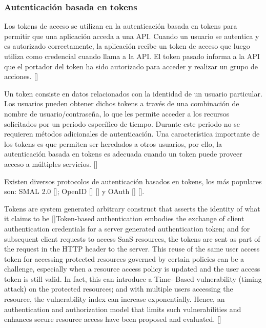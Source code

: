 
\subsubsection{Autenticación basada en tokens}

Los tokens de acceso se utilizan en la autenticación basada en tokens para permitir que una aplicación acceda a una API. Cuando un usuario se autentica y es autorizado correctamente, la aplicación recibe un token de acceso que luego utiliza como credencial cuando llama a la API. El token pasado informa a la API que el portador del token ha sido autorizado para acceder y realizar un grupo de acciones. [\cite{auth0AccessTokens}]


Un token consiste en datos relacionados con la identidad de un usuario particular. Los usuarios pueden obtener dichos tokens a través de una combinación de nombre de usuario/contraseña, lo que les permite acceder a los recursos solicitados por un periodo específico de tiempo. Durante este periodo no se requieren métodos adicionales de autenticación. Una característica importante de los tokens es que permiten ser heredados a otros usuarios, por ello, la autenticación basada en tokens es adecuada cuando un token puede proveer acceso a múltiples servicios. [\cite{banerjee2018token}] %

Existen diversos protocolos de autenticación basados en tokens, los más populares son: SMAL 2.0 [\cite{cantor2005assertions}]; OpenID [\cite{recordon2006openid}] [\cite{mainka2017sok}] y OAuth [\cite{hardt2012oauth}] [\cite{richer2017oauth}]. 

Tokens are system generated arbitrary construct that asserts the identity of what it claims to be [\cite{zheng2014token}]Token-based authentication embodies the exchange of client authentication credentials for a server generated authentication token; and for subsequent client requests to access SaaS resources, the tokens are sent as part of the request in the HTTP header to the server. This reuse of the same user access token for accessing protected resources governed by certain policies can be a challenge, especially when a resource access policy is updated and the user access token is still valid. In fact, this can introduce a Time- Based vulnerability (timing attack) on the protected resources; and with multiple users accessing the resource, the vulnerability index can increase exponentially. Hence, an authentication and authorization model that limits such vulnerabilities and enhances secure resource access have been proposed and evaluated. [\cite{ethelbert2017json}]

